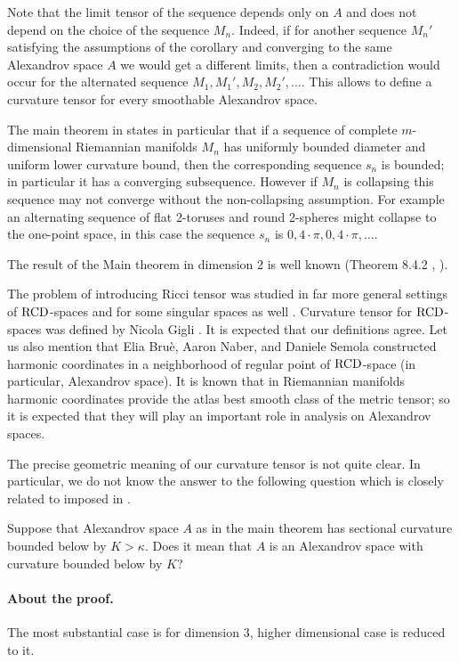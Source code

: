 Note that the limit tensor of the sequence depends only on $A$ and does not depend on the choice of the sequence $M_n$.
Indeed, if for another sequence $M_n'$ satisfying the assumptions of the corollary and converging to the same Alexandrov space $A$ we would get a different limits, 
then a contradiction would occur for the alternated sequence $M_1,M_1',M_2,M_2',\dots$. This allows to define a curvature
tensor for every smoothable Alexandrov space. 

The main theorem in \cite{petrunin-SC} states in particular that if a sequence of complete $m$-dimensional Riemannian  manifolds $M_n$ has uniformly bounded diameter and uniform lower curvature bound, then 
the corresponding sequence $s_n$ is bounded; in particular it has a converging subsequence.
However if $M_n$ is collapsing this sequence may not converge
without the non-collapsing assumption.
For example an alternating sequence of flat 2-toruses and round 2-spheres might collapse to the one-point space, in this case the sequence $s_n$ is $0,4\cdot\pi,0,4\cdot\pi,\dots$.

The result of the Main theorem in dimension 2 is well
 known (Theorem 8.4.2 \cite{Resh}, \cite{AZ} ).

The problem of introducing Ricci tensor
was studied in far more general settings of 
 $\operatorname{RCD}$-spaces \cite{G1,St,H}
 and
for some singular  spaces as well \cite{L}.
Curvature tensor for  $\operatorname{RCD}$-spaces was defined by Nicola Gigli \cite{G}.
It is expected that our definitions agree.
Let us also mention that Elia Bruè, Aaron Naber, and Daniele Semola \cite{BNS} constructed harmonic coordinates in a neighborhood of regular point of $\operatorname{RCD}$-space (in particular, Alexandrov space).
It is known that in Riemannian manifolds harmonic coordinates provide the atlas best smooth class of the metric tensor; so it is expected that they will play an important role in analysis on Alexandrov spaces.  


The precise geometric meaning of our curvature tensor is not quite clear. 
In particular, we do not know the answer to the following question which is closely related to imposed in \cite[Conjecture~1.1]{G}.

Suppose that Alexandrov space $A$ as in the main theorem has sectional curvature bounded below by $K>\kappa$.
Does it mean that $A$ is an Alexandrov space with curvature bounded below by $K$?

\paragraph{About the proof.}
The most substantial case is for dimension $3$, higher dimensional case is reduced to it.

